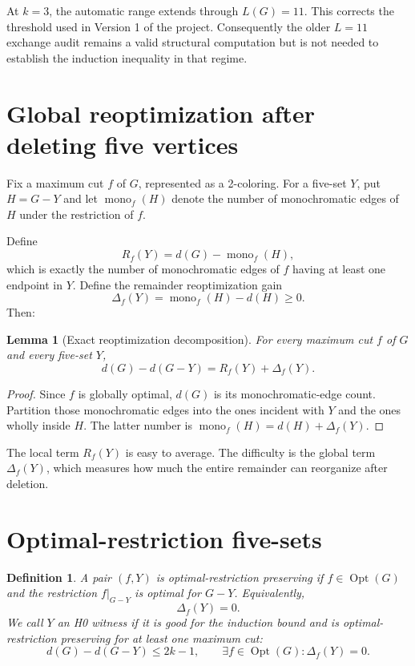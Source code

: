 \documentclass[11pt]{article}
\newtheorem{lemma}{Lemma}
\newtheorem{definition}{Definition}
\newcommand{\dd}{d}
\newcommand{\Opt}{\operatorname{Opt}}
\begin{document}
At $k=3$, the automatic range extends through $L(G)=11$.  This corrects
the threshold used in Version 1 of the project.  Consequently the older
$L=11$ exchange audit remains a valid structural computation but is not
needed to establish the induction inequality in that regime.

\section{Global reoptimization after deleting five vertices}

Fix a maximum cut $f$ of $G$, represented as a 2-coloring.  For a five-set
$Y$, put $H=G-Y$ and let $\operatorname{mono}_f(H)$ denote the number of
monochromatic edges of $H$ under the restriction of $f$.

Define
\[
R_f(Y)=\dd(G)-\operatorname{mono}_f(H),
\]
which is exactly the number of monochromatic edges of $f$ having at least
one endpoint in $Y$.  Define the remainder reoptimization gain
\[
\Delta_f(Y)=\operatorname{mono}_f(H)-\dd(H)\ge0.
\]
Then:

\begin{lemma}[Exact reoptimization decomposition]
For every maximum cut $f$ of $G$ and every five-set $Y$,
\[
\boxed{
\dd(G)-\dd(G-Y)=R_f(Y)+\Delta_f(Y).
}
\]
\end{lemma}

\begin{proof}
Since $f$ is globally optimal, $\dd(G)$ is its monochromatic-edge count.
Partition those monochromatic edges into the ones incident with $Y$ and
the ones wholly inside $H$.  The latter number is
$\operatorname{mono}_f(H)=\dd(H)+\Delta_f(Y)$.
\end{proof}

The local term $R_f(Y)$ is easy to average.  The difficulty is the global
term $\Delta_f(Y)$, which measures how much the entire remainder can
reorganize after deletion.

\section{Optimal-restriction five-sets}

\begin{definition}
A pair $(f,Y)$ is \emph{optimal-restriction preserving} if
$f\in\Opt(G)$ and the restriction $f|_{G-Y}$ is optimal for $G-Y$.
Equivalently,
\[
\Delta_f(Y)=0.
\]
We call $Y$ an \emph{H0 witness} if it is good for the induction bound and
is optimal-restriction preserving for at least one maximum cut:
\[
\dd(G)-\dd(G-Y)\le 2k-1,
\qquad
\exists f\in\Opt(G):\Delta_f(Y)=0.
\]
\end{definition}
\end{document}
